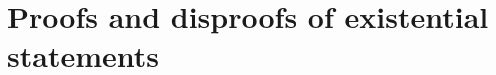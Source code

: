 


\newpage

\section[Existential statements]{Proofs and disproofs of existential statements}
\label{sec:exist}






%
%

 
